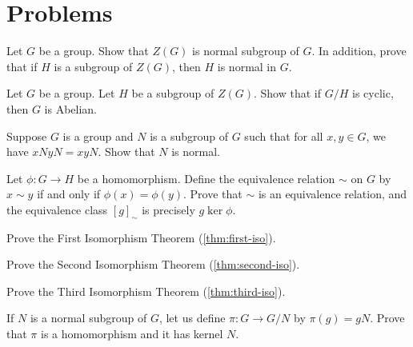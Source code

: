\documentclass[./main.tex]{subfiles}
\begin{document}
\section{Problems}

\begin{exercise}
\label{ex:center-is-always-normal}
    Let $G$ be a group. Show that $Z(G)$ is normal subgroup of $G$. In addition,
    prove that if $H$ is a subgroup of $Z(G)$, then $H$ is normal in $G$.
\end{exercise}

\begin{exercise}
    Let $G$ be a group. Let $H$ be a subgroup of $Z(G)$. Show that if $G/H$ is
    cyclic, then $G$ is Abelian. 
\end{exercise}

\begin{exercise}
\label{ex:converse-of-quotient-groups-existence}
    Suppose $G$ is a group and $N$ is a subgroup of $G$ such that for all $x, y
    \in G$, we have $xN yN = xyN$. Show that $N$ is normal.
\end{exercise}

\begin{exercise}
\label{ex:homomorphism-induces-equiv-relation}
    Let $\phi: G \to H$ be a homomorphism. Define the equivalence relation
    $\sim$ on $G$ by $x \sim y$ if and only if $\phi(x) = \phi(y)$. Prove that $\sim$
    is an equivalence relation, and the equivalence class $[g]_\sim$ is
    precisely $g\ker\phi$.
\end{exercise}

\begin{exercise}
\label{ex:prove-first-iso}
    Prove the First Isomorphism Theorem (\cref{thm:first-iso}).
\end{exercise}

\begin{exercise}
\label{ex:prove-second-iso}
    Prove the Second Isomorphism Theorem (\cref{thm:second-iso}).
\end{exercise}

\begin{exercise}
\label{ex:prove-third-iso}
    Prove the Third Isomorphism Theorem (\cref{thm:third-iso}).
\end{exercise}

\begin{exercise}
\label{ex:kernel-of-projection}
    If $N$ is a normal subgroup of $G$, let us define $\pi: G \to G/N$ by
    $\pi(g) = gN$. Prove that $\pi$ is a homomorphism and it has kernel $N$.
\end{exercise}
\end{document}
